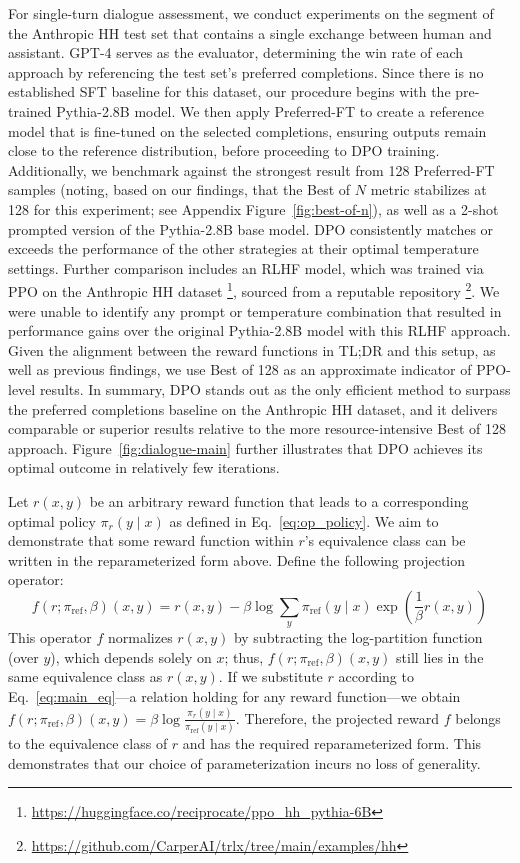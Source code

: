 For single-turn dialogue assessment, we conduct experiments on the segment of the Anthropic HH test set \citep{bai2022training} that contains a single exchange between human and assistant. GPT-4 serves as the evaluator, determining the win rate of each approach by referencing the test set's preferred completions. Since there is no established SFT baseline for this dataset, our procedure begins with the pre-trained Pythia-2.8B model. We then apply Preferred-FT to create a reference model that is fine-tuned on the selected completions, ensuring outputs remain close to the reference distribution, before proceeding to DPO training. Additionally, we benchmark against the strongest result from 128 Preferred-FT samples (noting, based on our findings, that the Best of $N$ metric stabilizes at 128 for this experiment; see Appendix Figure~\ref{fig:best-of-n}), as well as a 2-shot prompted version of the Pythia-2.8B base model. DPO consistently matches or exceeds the performance of the other strategies at their optimal temperature settings. Further comparison includes an RLHF model, which was trained via PPO on the Anthropic HH dataset \footnote{\url{https://huggingface.co/reciprocate/ppo_hh_pythia-6B}}, sourced from a reputable repository \footnote{\url{https://github.com/CarperAI/trlx/tree/main/examples/hh}}. We were unable to identify any prompt or temperature combination that resulted in performance gains over the original Pythia-2.8B model with this RLHF approach. Given the alignment between the reward functions in TL;DR and this setup, as well as previous findings, we use Best of 128 as an approximate indicator of PPO-level results. In summary, DPO stands out as the only efficient method to surpass the preferred completions baseline on the Anthropic HH dataset, and it delivers comparable or superior results relative to the more resource-intensive Best of 128 approach. Figure~\ref{fig:dialogue-main} further illustrates that DPO achieves its optimal outcome in relatively few iterations.

\begin{sproof}
    Let $r(x, y)$ be an arbitrary reward function that leads to a corresponding optimal policy $\pi_r(y \mid x)$ as defined in Eq.~\ref{eq:op_policy}. We aim to demonstrate that some reward function within $r$'s equivalence class can be written in the reparameterized form above. Define the following projection operator:
\begin{equation}
    f(r; \pi_\text{ref}, \beta)(x, y) = r(x, y) - \beta\log\sum_{y}\pi_\text{ref}(y\mid x)\exp\left(\frac{1}{\beta}r(x, y)\right)
\end{equation}
This operator $f$ normalizes $r(x, y)$ by subtracting the log-partition function (over $y$), which depends solely on $x$; thus, $f(r; \pi_\text{ref}, \beta)(x, y)$ still lies in the same equivalence class as $r(x, y)$. If we substitute $r$ according to Eq.~\ref{eq:main_eq}—a relation holding for any reward function—we obtain $f(r; \pi_\text{ref}, \beta)(x, y) = \beta \log \frac{\pi_r(y\mid x)}{\pi_\text{ref}(y\mid x)}$. Therefore, the projected reward $f$ belongs to the equivalence class of $r$ and has the required reparameterized form. This demonstrates that our choice of parameterization incurs no loss of generality.
\end{sproof}


